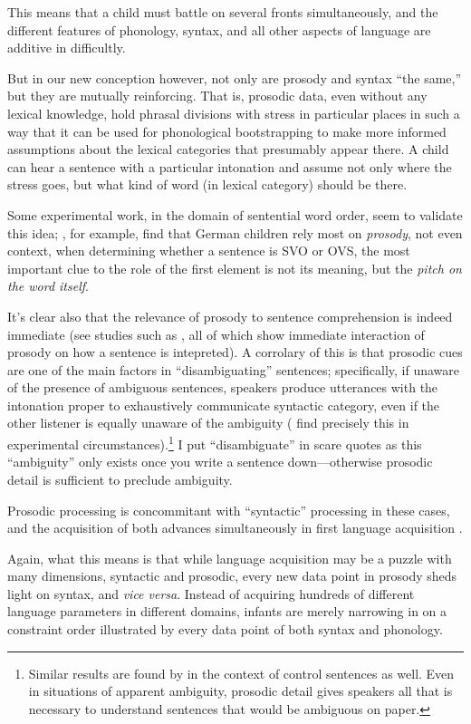 \documentclass{article}
\begin{document}
This means that a child must battle on several fronts simultaneously, and the different features of phonology, syntax, and all other aspects of language are additive in difficultly.

But in our new conception however, not only are prosody and syntax ``the same,'' but they are mutually reinforcing.
That is, prosodic data, even without any lexical knowledge, hold phrasal divisions with stress in particular places in such a way that it can be used for phonological bootstrapping to make more informed assumptions about the lexical categories that presumably appear there.
A child can hear a sentence with a particular intonation and assume not only where the stress goes, but what kind of word (in lexical category) should be there.

Some experimental work, in the domain of sentential word order, seem to validate this idea; \textcite{grunloh11}, for example, find that German children rely most on \emph{prosody}, not even context, when determining whether a sentence is SVO or OVS, the most important clue to the role of the first element is not its meaning, but the \emph{pitch on the word itself}.

It's clear also that the relevance of prosody to sentence comprehension is indeed immediate (see studies such as \textcite{eckstein06,kerkhofs07,sammler10}, all of which show immediate interaction of prosody on how a sentence is intepreted).
A corrolary of this is that prosodic cues are one of the main factors in ``disambiguating'' sentences; specifically, if unaware of the presence of ambiguous sentences, speakers produce utterances with the intonation proper to exhaustively communicate syntactic category, even if the other listener is equally unaware of the ambiguity (\textcite{millotte07} find precisely this in experimental circumstances).\footnote{Similar results are found by \textcite{bogels09} in the context of control sentences as well. Even in situations of apparent ambiguity, prosodic detail gives speakers all that is necessary to understand sentences that would be ambiguous on paper.}
I put ``disambiguate'' in scare quotes as this ``ambiguity'' only exists once you write a sentence down---otherwise prosodic detail is sufficient to preclude ambiguity.

Prosodic processing is concommitant with ``syntactic'' processing in these cases, and the acquisition of both advances simultaneously in first language acquisition \parencite{mannel11}.

Again, what this means is that while language acquisition may be a puzzle with many dimensions, syntactic and prosodic, every new data point in prosody sheds light on syntax, and \textit{vice versa}.
Instead of acquiring hundreds of different language parameters in different domains, infants are merely narrowing in on a constraint order illustrated by every data point of both syntax and phonology.
\end{document}
